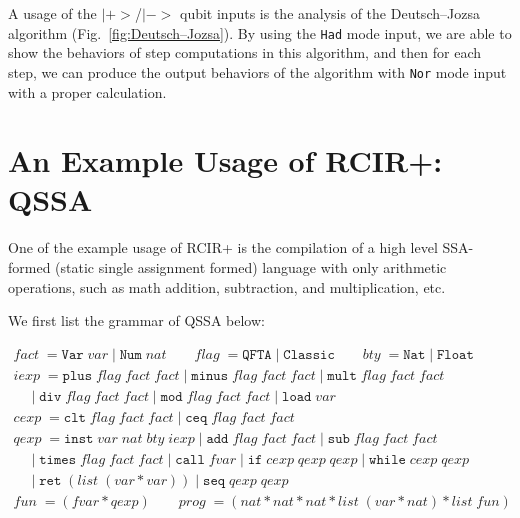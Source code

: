 A usage of the $|+>$/$|->$ qubit inputs is the analysis of the Deutsch–Jozsa algorithm (Fig.~\ref{fig:Deutsch–Jozsa}). By using the \texttt{Had} mode input, we are able to show the behaviors of step computations in this algorithm, and then for each step, we can produce the output behaviors of the algorithm with \texttt{Nor} mode input with a proper calculation. 

\section{An Example Usage of RCIR+: QSSA}
\label{sec:qssa}

One of the example usage of RCIR+ is the compilation of a high level SSA-formed (static single assignment formed) language with only arithmetic operations, such as math addition, subtraction, and multiplication, etc.

We first list the grammar of QSSA below:

\[
\begin{array}{l}
 fact \;= \texttt{Var}\; var \;|\; \texttt{Num} \;nat
\qquad
flag \;=\texttt{QFTA}\;|\;\texttt{Classic}
\qquad
bty\;=\texttt{Nat}\;|\;\texttt{Float}
\\[0.5em]
iexp \;=\texttt{plus}\;flag\;fact\;fact\;|\;\texttt{minus}\;flag\;fact\;fact\;|\;\texttt{mult}\;flag\;fact\;fact
\\\quad\;|\;\texttt{div}\;flag\;fact\;fact\;|\;\texttt{mod}\;flag\;fact\;fact\;|\;\texttt{load}\;var
\\[0.5em]
cexp \;=\texttt{clt}\;flag\;fact\;fact\;|\;\texttt{ceq}\;flag\;fact\;fact
\\[0.5em]
qexp\;=\texttt{inst}\;var\;nat\;bty\;iexp\;|\;\texttt{add}\;flag\;fact\;fact\;|\;\texttt{sub}\;flag\;fact\;fact
\\\quad\;|\;\texttt{times}\;flag\;fact\;fact
\;|\;\texttt{call}\;fvar
\;|\;\texttt{if}\;cexp\;qexp\;qexp
\;|\;\texttt{while}\;cexp\;qexp
\\\quad
\;|\;\texttt{ret}\;(list\;(var * var))
\;|\;\texttt{seq}\;qexp\;qexp
\\[0.5em]
fun\;=(fvar * qexp)
\qquad
prog\;=(nat * nat * nat * list\;(var * nat) * list\;fun)
\end{array}
\]

